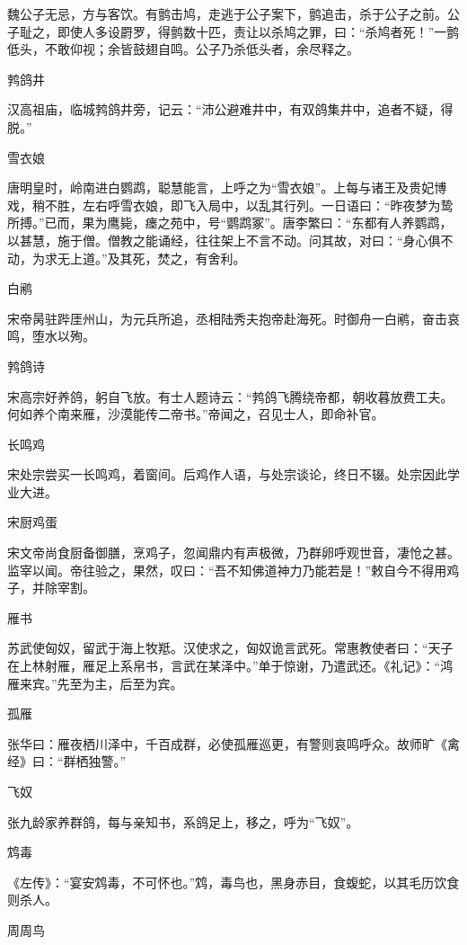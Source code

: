 \documentclass[a4paper,12pt,UTF8,twoside]{ctexbook}
\begin{document}
    魏公子无忌，方与客饮。有鹯击鸠，走逃于公子案下，鹯追击，杀于公子之前。公子耻之，即使人多设罻罗，得鹯数十匹，责让以杀鸠之罪，曰：“杀鸠者死！”一鹯低头，不敢仰视；余皆鼓翅自鸣。公子乃杀低头者，余尽释之。
    
    鹁鸽井
    
    汉高祖庙，临城鹁鸽井旁，记云：“沛公避难井中，有双鸽集井中，追者不疑，得脱。”
    
    雪衣娘
    
    唐明皇时，岭南进白鹦鹉，聪慧能言，上呼之为“雪衣娘”。上每与诸王及贵妃博戏，稍不胜，左右呼雪衣娘，即飞入局中，以乱其行列。一日语曰：“昨夜梦为鸷所搏。”已而，果为鹰毙，瘗之苑中，号“鹦鹉冢”。唐李繁曰：“东都有人养鹦鹉，以甚慧，施于僧。僧教之能诵经，往往架上不言不动。问其故，对曰：“身心俱不动，为求无上道。”及其死，焚之，有舍利。
    
    白鹇
    
    宋帝昺驻跸厓州山，为元兵所追，丞相陆秀夫抱帝赴海死。时御舟一白鹇，奋击哀鸣，堕水以殉。
    
    鹁鸽诗
    
    宋高宗好养鸽，躬自飞放。有士人题诗云：“鹁鸽飞腾绕帝都，朝收暮放费工夫。何如养个南来雁，沙漠能传二帝书。”帝闻之，召见士人，即命补官。
    
    长鸣鸡
    
    宋处宗尝买一长鸣鸡，着窗间。后鸡作人语，与处宗谈论，终日不辍。处宗因此学业大进。
    
    宋厨鸡蛋
    
    宋文帝尚食厨备御膳，烹鸡子，忽闻鼎内有声极微，乃群卵呼观世音，凄怆之甚。监宰以闻。帝往验之，果然，叹曰：“吾不知佛道神力乃能若是！”敕自今不得用鸡子，并除宰割。
    
    雁书
    
    苏武使匈奴，留武于海上牧羝。汉使求之，匈奴诡言武死。常惠教使者曰：“天子在上林射雁，雁足上系帛书，言武在某泽中。”单于惊谢，乃遣武还。《礼记》：“鸿雁来宾。”先至为主，后至为宾。
    
    孤雁
    
    张华曰：雁夜栖川泽中，千百成群，必使孤雁巡更，有警则哀鸣呼众。故师旷《禽经》曰：“群栖独警。”
    
    飞奴
    
    张九龄家养群鸽，每与亲知书，系鸽足上，移之，呼为“飞奴”。
    
    鸩毒
    
    《左传》：“宴安鸩毒，不可怀也。”鸩，毒鸟也，黑身赤目，食蝮蛇，以其毛历饮食则杀人。
    
    周周鸟
    
\end{document}

